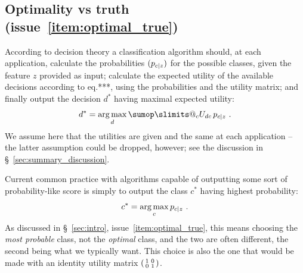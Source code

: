 \documentclass[\ifafour a4paper,12pt,\else a5paper,10pt,\fi%
onecolumn,oneside,article,%
british%
]{memoir}
\makeatletter
\theoremstyle{remark}
\theoremstyle{innote}
\def\sum{\DOTSI\sumop\slimits@}
\newcommand*{\puzzle}{{\fontencoding{U}\fontfamily{fontawesometwo}\selectfont\symbol{225}}}
\newcommand{\mynotez}[1]{{\footnotesize\color{notecolour}\puzzle\ #1}}
\renewcommand*{\|}[1][]{\nonscript\:#1\vert\nonscript\:\mathopen{}}
\newcommand*{\sect}{\S}%
\newcommand*{\eqn}{eq.}%
\DeclareMathOperator*{\argmax}{arg\,max}
\newcommand*{\Po}{\mathord{+}}
\newcommand*{\Ne}{\mathord{-}}
\newcommand*{\tp}{\textrm{tp}}
\newcommand*{\fp}{\textrm{fp}}
\newcommand*{\itemno}{{\fontencoding{U}\fontfamily{pzd}\selectfont\symbol{55}}}
\makeatother
\begin{document}







\subsection{Optimality vs truth (issue~\ref{item:optimal_true})}
\label{sec:optimality_truth}

According to decision theory a classification algorithm should, at each application, calculate the probabilities $(p_{c\|z})$ for the possible classes, given the feature $z$ provided as input; calculate the expected utility of the available decisions according to \eqn***, using the probabilities and the utility matrix; and finally output the decision $d^{*}$ having maximal expected utility:
\begin{equation}
  \label{eq:argmax_decision}
  d^{*} = \argmax_{d}   \sum_{c} U_{dc}\, p_{c\|z} \ .
\end{equation}
We assume here that the utilities are given and the same at each application -- the latter assumption could be dropped, however; see the discussion in \sect~\ref{sec:summary_discussion}.

Current common practice with algorithms capable of outputting some sort of probability-like score is simply to output the class $c^{*}$ having highest probability:
\begin{equation}
  \label{eq:argmax_probable}
  c^{*} = \argmax_{c} p_{c\|z} \ .
\end{equation}
As discussed in \sect~\ref{sec:intro}, issue~\ref{item:optimal_true}, this means choosing the \emph{most probable} class, not the \emph{optimal} class, and the two are often different, the second being what we typically want. This choice is also the one that would be made with an identity utility matrix $\begin{psmallmatrix} 1&0\\0&1 \end{psmallmatrix}$.
\end{document}
